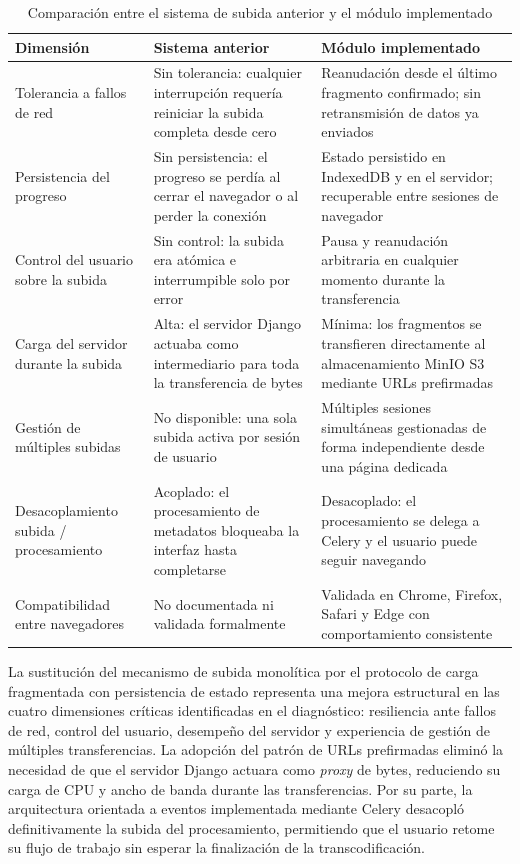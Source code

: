 \begin{table}[H]
\centering
\caption{Comparación entre el sistema de subida anterior y el módulo implementado}
\label{tab:comparacion}
\begin{tabular}{|p{4.2cm}|p{4.5cm}|p{4.5cm}|}
\hline
\textbf{Dimensión} & \textbf{Sistema anterior} & \textbf{Módulo implementado} \\
\hline
Tolerancia a fallos de red &
  Sin tolerancia: cualquier interrupción requería reiniciar la subida completa desde cero &
  Reanudación desde el último fragmento confirmado; sin retransmisión de datos ya enviados \\
\hline
Persistencia del progreso &
  Sin persistencia: el progreso se perdía al cerrar el navegador o al perder la conexión &
  Estado persistido en IndexedDB y en el servidor; recuperable entre sesiones de navegador \\
\hline
Control del usuario sobre la subida &
  Sin control: la subida era atómica e interrumpible solo por error &
  Pausa y reanudación arbitraria en cualquier momento durante la transferencia \\
\hline
Carga del servidor durante la subida &
  Alta: el servidor Django actuaba como intermediario para toda la transferencia de bytes &
  Mínima: los fragmentos se transfieren directamente al almacenamiento MinIO S3 mediante
  URLs prefirmadas \\
\hline
Gestión de múltiples subidas &
  No disponible: una sola subida activa por sesión de usuario &
  Múltiples sesiones simultáneas gestionadas de forma independiente desde una página dedicada \\
\hline
Desacoplamiento subida / procesamiento &
  Acoplado: el procesamiento de metadatos bloqueaba la interfaz hasta completarse &
  Desacoplado: el procesamiento se delega a Celery y el usuario puede seguir navegando \\
\hline
Compatibilidad entre navegadores &
  No documentada ni validada formalmente &
  Validada en Chrome, Firefox, Safari y Edge con comportamiento consistente \\
\hline
\end{tabular}
\end{table}

La sustitución del mecanismo de subida monolítica por el protocolo de carga fragmentada con
persistencia de estado representa una mejora estructural en las cuatro dimensiones críticas
identificadas en el diagnóstico: resiliencia ante fallos de red, control del usuario, desempeño
del servidor y experiencia de gestión de múltiples transferencias. La adopción del patrón de URLs
prefirmadas eliminó la necesidad de que el servidor Django actuara como \textit{proxy} de bytes,
reduciendo su carga de CPU y ancho de banda durante las transferencias. Por su parte, la
arquitectura orientada a eventos implementada mediante Celery desacopló definitivamente la subida
del procesamiento, permitiendo que el usuario retome su flujo de trabajo sin esperar la finalización
de la transcodificación.

